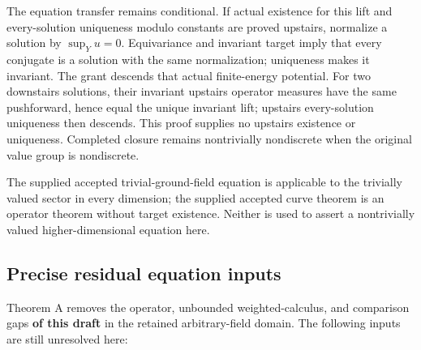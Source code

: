 \documentclass[
]{article}
\begin{document}
The equation transfer remains conditional. If actual existence for this
lift and every-solution uniqueness modulo constants are proved upstairs,
normalize a solution by \(\sup_Yu=0\). Equivariance and invariant target
imply that every conjugate is a solution with the same normalization;
uniqueness makes it invariant. The grant descends that actual
finite-energy potential. For two downstairs solutions, their invariant
upstairs operator measures have the same pushforward, hence equal the
unique invariant lift; upstairs every-solution uniqueness then descends.
This proof supplies no upstairs existence or uniqueness. Completed
closure remains nontrivially nondiscrete when the original value group
is nondiscrete.

The supplied accepted trivial-ground-field equation is applicable to the
trivially valued sector in every dimension; the supplied accepted curve
theorem is an operator theorem without target existence. Neither is used
to assert a nontrivially valued higher-dimensional equation here.

\subsection{Precise residual equation
inputs}\label{precise-residual-equation-inputs}

Theorem A removes the operator, unbounded weighted-calculus, and
comparison gaps \textbf{of this draft} in the retained arbitrary-field
domain. The following inputs are still unresolved here:
\end{document}
